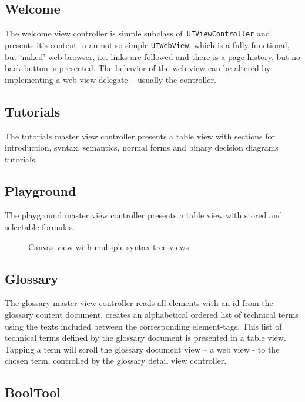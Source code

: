 \subsection{Welcome}

The welcome view controller is simple subclass of\verb+ UIViewController+ and presents it's content in an not so simple \verb+UIWebView+,
which is a fully functional, but ‘naked’ web-browser, i.e. links are followed and there is a page history, but no back-button is presented.
The behavior of the web view can be altered by implementing a web view delegate – usually the controller.

\subsection{Tutorials}

The tutorials master view controller presents a table view with 
sections for introduction, syntax, semantics, normal forms and binary decision diagrams tutorials.

\subsection{Playground}

The playground master view controller presents a table view with stored and selectable formulas.

\begin{figure}[htbp]
\begin{center}
\caption{Canvas view with multiple syntax tree views}
\label{fig:TreeView}
\end{center}
\end{figure}

\subsection{Glossary}

The glossary master view controller reads all elements with an id from the glossary content document,
creates an alphabetical ordered list of technical terms using the texts included between the corresponding element-tags.
This list of technical terms defined by the glossary document is presented in a table view.
Tapping a term will scroll the glossary document view – a web view - to the chosen term, 
controlled by the glossary detail view controller.

\subsection{BoolTool}

